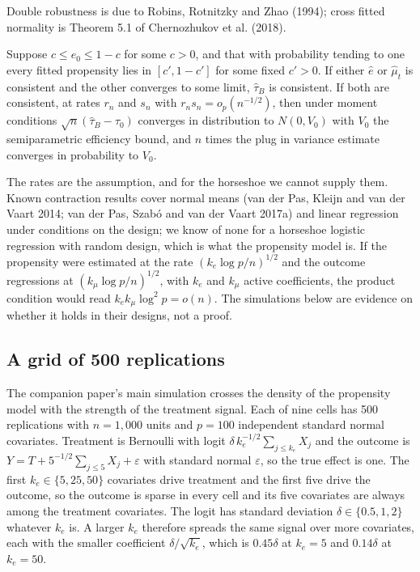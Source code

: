 Double robustness is due to Robins, Rotnitzky and Zhao (1994); cross fitted normality is Theorem 5.1 of Chernozhukov et al. (2018).

\begin{theorem}
Suppose $c \leq e_0 \leq 1 - c$ for some $c > 0$, and that with probability tending to one every fitted propensity lies in $[c', 1 - c']$ for some fixed $c' > 0$. If either $\hat e$ or $\hat\mu_t$ is consistent and the other converges to some limit, $\hat\tau_B$ is consistent. If both are consistent, at rates $r_n$ and $s_n$ with $r_ns_n = o_p(n^{-1/2})$, then under moment conditions $\sqrt{n}(\hat\tau_B - \tau_0)$ converges in distribution to $N(0, V_0)$ with $V_0$ the semiparametric efficiency bound, and $n$ times the plug in variance estimate converges in probability to $V_0$.
\end{theorem}

The rates are the assumption, and for the horseshoe we cannot supply them. Known contraction results cover normal means (van der Pas, Kleijn and van der Vaart 2014; van der Pas, Szab\'o and van der Vaart 2017a) and linear regression under conditions on the design; we know of none for a horseshoe logistic regression with random design, which is what the propensity model is. If the propensity were estimated at the rate $(k_e\log p/n)^{1/2}$ and the outcome regressions at $(k_\mu\log p/n)^{1/2}$, with $k_e$ and $k_\mu$ active coefficients, the product condition would read $k_ek_\mu\log^2 p = o(n)$. The simulations below are evidence on whether it holds in their designs, not a proof.

\subsection{A grid of 500 replications}

The companion paper's main simulation crosses the density of the propensity model with the strength of the treatment signal. Each of nine cells has 500 replications with $n = 1{,}000$ units and $p = 100$ independent standard normal covariates. Treatment is Bernoulli with logit $\delta\,k_e^{-1/2}\sum_{j\leq k_e}X_j$ and the outcome is $Y = T + 5^{-1/2}\sum_{j\leq 5}X_j + \varepsilon$ with standard normal $\varepsilon$, so the true effect is one. The first $k_e \in \{5, 25, 50\}$ covariates drive treatment and the first five drive the outcome, so the outcome is sparse in every cell and its five covariates are always among the treatment covariates. The logit has standard deviation $\delta \in \{0.5, 1, 2\}$ whatever $k_e$ is. A larger $k_e$ therefore spreads the same signal over more covariates, each with the smaller coefficient $\delta/\sqrt{k_e}$, which is $0.45\delta$ at $k_e = 5$ and $0.14\delta$ at $k_e = 50$.


